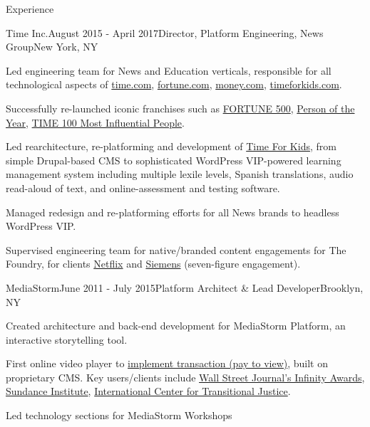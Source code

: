 \documentclass{resume} %
\begin{document}
\begin{rSection}{Experience}
\begin{rSubsection}{Time Inc.}{August 2015 - April 2017}{Director, Platform Engineering, News Group}{New York, NY}
\item Led engineering team for News and Education verticals, responsible for all technological aspects of \href{http://time.com}{time.com}, \href{http://fortune.com}{fortune.com},  \href{http://money.com}{money.com}, \href{https://www.timeforkids.com}{timeforkids.com}. 
\item Successfully re-launched iconic franchises such as \href{http://fortune.com/fortune500}{FORTUNE 500}, \href{http://time.com/time-person-of-the-year-2017-silence-breakers/}{Person of the Year}, \href{http://time.com/collection/most-influential-people-2018/}{TIME 100 Most Influential People}.
\item Led rearchitecture, re-platforming and development of \href{https://www.timeforkids}{Time For Kids}, from simple Drupal-based CMS to sophisticated WordPress VIP-powered learning management system including multiple lexile levels, Spanish translations, audio read-aloud of text, and online-assessment and testing software. 
\item Managed redesign and re-platforming efforts for all News brands to headless WordPress VIP.
\item Supervised engineering team for native/branded content engagements for The Foundry, for clients \href{http://time.com/paid-content-from/netflix/dinnertime/}{Netflix} and \href{http://time.com/partner/siemens/innovation-starts-here/}{Siemens} (seven-figure engagement).
\end{rSubsection}


\begin{rSubsection}{MediaStorm}{June 2011 - July 2015}{Platform Architect \& Lead Developer}{Brooklyn, NY}
\item Created architecture and back-end development for MediaStorm Platform, an interactive storytelling tool. 
\item First online video player to \href{http://time.com/46716/game-changer-mediastorm-launches-pay-per-story-video-player/}{implement transaction (pay to view)}, built on proprietary CMS. Key users/clients include \href{https://mediastorm.com/clients/2018-icp-infinity-awards}{Wall Street Journal's Infinity Awards}, \href{https://mediastorm.com/clients/sundance-short-film-challenge}{Sundance Institute}, \href{https://mediastorm.com/clients/i-am-not-who-they-think-i-am-for-ictj}{International Center for Transitional Justice}. 
\item Led technology sections for MediaStorm Workshops
\end{rSubsection}


\end{rSection}
\end{document}
